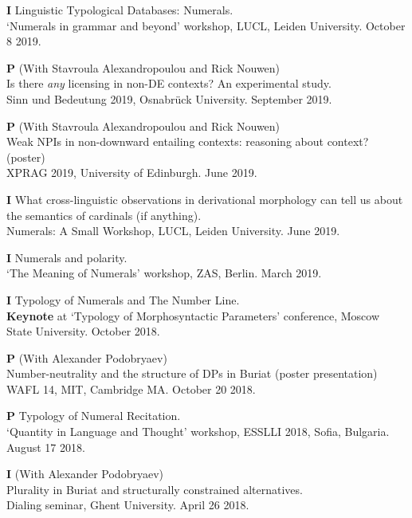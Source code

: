 \documentclass[12pt,letterpaper]{article}
\begin{document}
{\begin{hangparas}{.25in}{1}
\textbf{I} \hspace{2mm} Linguistic Typological Databases: Numerals.\\
`Numerals in grammar and beyond' workshop, LUCL, Leiden University. October 8 2019.
 
\textbf{P} \hspace{2mm} (With Stavroula Alexandropoulou and Rick Nouwen) \\
Is there {\em any} licensing in non-DE contexts? An experimental study.\\
Sinn und Bedeutung 2019, Osnabr\"{u}ck University. September 2019.

\textbf{P} \hspace{2mm} (With Stavroula Alexandropoulou and Rick Nouwen) \\
Weak NPIs in non-downward entailing contexts: reasoning about context? (poster)\\
XPRAG 2019, University of Edinburgh. June 2019.

\textbf{I}  \hspace{2mm} What cross-linguistic observations in derivational morphology can tell us about the semantics of cardinals (if anything). \\
Numerals: A Small Workshop, LUCL, Leiden University. June 2019.

\textbf{I}  \hspace{2mm} Numerals and polarity.\\
`The Meaning of Numerals' workshop, ZAS, Berlin. March 2019.

\textbf{I}  \hspace{2mm} Typology of Numerals and The Number Line. \\
{\bf Keynote} at `Typology of Morphosyntactic Parameters' conference, Moscow State University. October 2018.

\textbf{P}  \hspace{2mm} (With Alexander Podobryaev) \\
Number-neutrality and the structure of DPs in Buriat (poster presentation)\\
WAFL 14, MIT, Cambridge MA. October 20 2018.

\textbf{P}  \hspace{2mm} Typology of Numeral Recitation. \\
`Quantity in Language and Thought' workshop, ESSLLI 2018, Sofia, Bulgaria. August 17 2018.

\textbf{I}  \hspace{2mm} (With Alexander Podobryaev) \\
Plurality in Buriat and structurally constrained alternatives. \\
Dialing seminar, Ghent University. April 26 2018.


\end{hangparas}}
\end{document}
